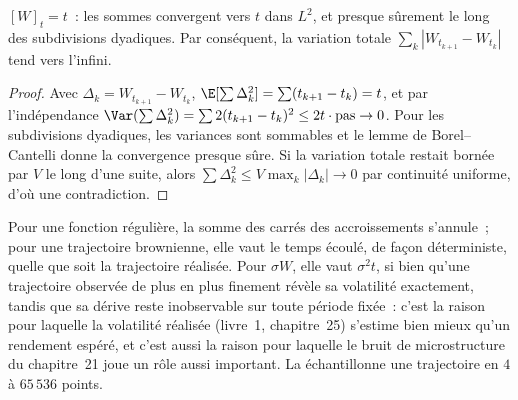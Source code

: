 \begin{theorem}\label{thm:qm:brownian-motion:qv}
$[W]_t = t$~: les sommes convergent vers $t$ dans $L^2$, et presque sûrement le long des subdivisions dyadiques.
Par conséquent, la variation totale $\sum_k|W_{t_{k+1}} - W_{t_k}|$ tend vers l'infini.
\end{theorem}

\begin{proof}
Avec $\Delta_k = W_{t_{k+1}} - W_{t_k}$, $\E[\sum\Delta_k^2] = \sum(t_{k+1} - t_k) = t$, et par
l'indépendance $\Var(\sum\Delta_k^2) = \sum 2(t_{k+1} - t_k)^2 \le 2t\cdot\text{pas} \to 0$. Pour
les subdivisions dyadiques, les variances sont sommables et le lemme de Borel--Cantelli donne
la convergence presque sûre. Si la variation totale restait bornée par $V$ le long d'une suite, alors $\sum\Delta_k^2
\le V\max_k|\Delta_k| \to 0$ par continuité uniforme, d'où une contradiction.
\end{proof}

Pour une fonction régulière, la somme des carrés des accroissements s'annule~; pour une trajectoire brownienne, elle vaut le
temps écoulé, de façon déterministe, quelle que soit la trajectoire réalisée. Pour $\sigma W$, elle vaut $\sigma^2 t$, si bien qu'une
trajectoire observée de plus en plus finement révèle sa volatilité exactement, tandis que sa dérive reste
inobservable sur toute période fixée~: c'est la raison pour laquelle la volatilité réalisée (livre~1,
chapitre~25) s'estime bien mieux qu'un rendement espéré, et c'est aussi la raison pour laquelle le
bruit de microstructure du chapitre~21 joue un rôle aussi important. La 
échantillonne une trajectoire en $4$ à $65\,536$ points.

\begin{omfigure}

\label{fig:qm:brownian-motion:qv}
\end{omfigure}

